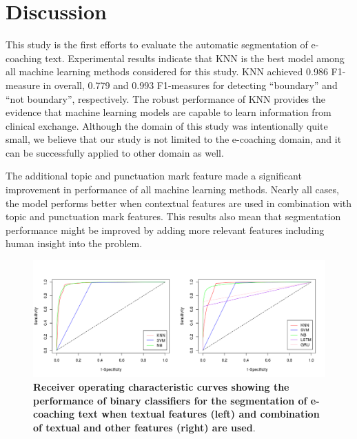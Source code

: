 \documentclass{amia}
\begin{document}
\section*{Discussion}
This study is the first efforts to evaluate the automatic segmentation of e-coaching text. Experimental results indicate that KNN is the best model among all machine learning methods considered for this study. KNN achieved 0.986 F1-measure in overall, 0.779 and 0.993 F1-measures for detecting ``boundary'' and ``not boundary'', respectively. The robust performance of KNN provides the evidence that machine learning models are capable to learn information from clinical exchange. Although the domain of this study was intentionally quite small, we believe that our study is not limited to the e-coaching domain, and it can be successfully applied to other domain as well.

The additional topic and punctuation mark feature made a significant improvement in performance of all machine learning methods. Nearly all cases, the model performs better when contextual features are used in combination with topic and punctuation mark features. This results also mean that segmentation performance might be improved by adding more relevant features including human insight into the problem.       

\begin{figure}[!htb]
    \centering
    \includegraphics[width=1.0\textwidth]{figures/roc-curves.png}
    \caption{\textbf{Receiver operating characteristic curves showing the performance of binary classifiers for the segmentation of e-coaching text when textual features (left) and combination of textual and other features (right) are used}.}
    \label{fig:roc-curves}
\end{figure}
\end{document}

